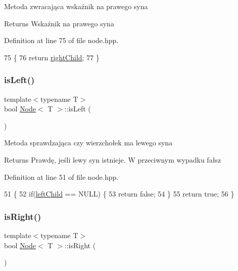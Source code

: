 Metoda zwracająca wskaźnik na prawego syna \begin{DoxyReturn}{Returns}
Wskaźnik na prawego syna 
\end{DoxyReturn}


Definition at line 75 of file node.\+hpp.


\begin{DoxyCode}
75                             \{
76              \textcolor{keywordflow}{return} \hyperlink{classNode_a625cff56d169157a568afaedbb11576b}{rightChild};
77         \}
\end{DoxyCode}
\mbox{\label{classNode_a906ae0e0b015275eacf168ef55017f7f}} 
\subsubsection{\texorpdfstring{is\+Left()}{isLeft()}}
{\footnotesize\ttfamily template$<$typename T$>$ \\
bool \hyperlink{classNode}{Node}$<$ T $>$\+::is\+Left (\begin{DoxyParamCaption}{ }\end{DoxyParamCaption})\hspace{0.3cm}{\ttfamily [inline]}}

Metoda sprawdzająca czy wierzchołek ma lewego syna \begin{DoxyReturn}{Returns}
Prawdę, jeśli lewy syn istnieje. W przeciwnym wypadku fałsz 
\end{DoxyReturn}


Definition at line 51 of file node.\+hpp.


\begin{DoxyCode}
51                       \{
52             \textcolor{keywordflow}{if}(\hyperlink{classNode_a2eaaeffaeef97da6291b788fa131c9ec}{leftChild} == NULL) \{
53                 \textcolor{keywordflow}{return} \textcolor{keyword}{false};
54             \}
55             \textcolor{keywordflow}{return} \textcolor{keyword}{true};
56         \}
\end{DoxyCode}
\mbox{\label{classNode_a983178a46cc464ca0738ee8c7d8b2cc4}} 
\subsubsection{\texorpdfstring{is\+Right()}{isRight()}}
{\footnotesize\ttfamily template$<$typename T$>$ \\
bool \hyperlink{classNode}{Node}$<$ T $>$\+::is\+Right (\begin{DoxyParamCaption}{ }\end{DoxyParamCaption})\hspace{0.3cm}{\ttfamily [inline]}}

